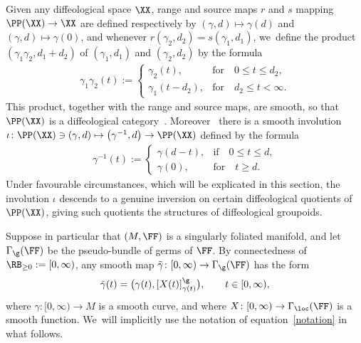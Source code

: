 Given any diffeological space $\XX$, range and source maps $r$ and $s$ mapping $\PP(\XX)\rightarrow \XX$ are defined respectively by $(\gamma,d)\mapsto \gamma(d)$ and $(\gamma,d)\mapsto\gamma(0)$, and whenever $r(\gamma_{2},d_{2}) = s(\gamma_{1},d_{1})$, we~define the product $(\gamma_{1}\gamma_{2},d_{1}+d_{2})$ of $(\gamma_{1},d_{1})$ and $(\gamma_{2},d_{2})$ by the formula
\begin{gather*}
\gamma_{1}\gamma_{2}(t):=
\begin{cases}
\gamma_{2}(t),&\text{for}\quad 0\leq t\leq d_{2},
\\
\gamma_{1}(t-d_{2}),&\text{for}\quad d_{2}\leq t<\infty.
\end{cases}
\end{gather*}
This product, together with the range and source maps, are smooth, so that $\PP(\XX)$ is a dif\-feo\-lo\-gi\-cal category~\cite[Proposition~3.22]{mac3}. Moreover~\cite[Proposition~3.23]{mac3} there is a smooth involution $\iota\colon \PP(\XX)\ni(\gamma,d)\mapsto\big(\gamma^{-1},d\big)\rightarrow\PP(\XX)$ defined by the formula
\begin{gather*}
\gamma^{-1}(t):=
\begin{cases}
\gamma(d-t),&\text{if}\quad 0\leq t\leq d,
\\
\gamma(0),&\text{for}\quad t\geq d.
\end{cases}
\end{gather*}
Under favourable circumstances, which will be explicated in this section, the involution $\iota$ des\-cends to a genuine inversion on certain diffeological quotients of $\PP(\XX)$, giving such quotients the structures of diffeological groupoids.

Suppose in particular that $(M,\FF)$ is a singularly foliated manifold, and let $\Gamma_{\g}(\FF)$ be the pseudo-bundle of germs of $\FF$. By connectedness of $\RB_{\geq0}:=[0,\infty)$, any smooth map $\tilde{\gamma}\colon [0,\infty)\rightarrow\Gamma_{\g}(\FF)$ has the form
\begin{gather}\label{notation}
\tilde{\gamma}(t) = \big(\gamma(t),[X(t)]^{\g}_{\gamma(t)}\big),\qquad t\in[0,\infty),
\end{gather}
where $\gamma\colon [0,\infty)\rightarrow M$ is a smooth curve, and where $X\colon [0,\infty)\rightarrow\Gamma_{\loc}(\FF)$ is a smooth function. We~will implicitly use the notation of equation~\eqref{notation} in what follows.

